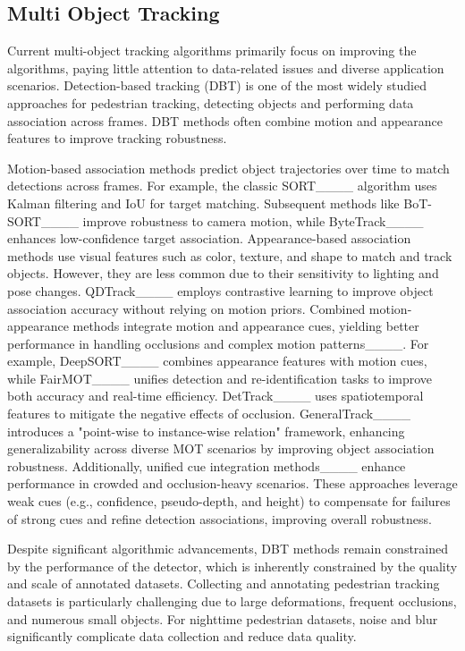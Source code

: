 \subsection{Multi Object Tracking}
Current multi-object tracking algorithms primarily focus on improving the algorithms, paying little attention to data-related issues and diverse application scenarios. Detection-based tracking (DBT) is one of the most widely studied approaches for pedestrian tracking, detecting objects and performing data association across frames. DBT methods often combine motion and appearance features to improve tracking robustness.

Motion-based association methods predict object trajectories over time to match detections across frames. For example, the classic SORT____ algorithm uses Kalman filtering and IoU for target matching. Subsequent methods like BoT-SORT____ improve robustness to camera motion, while ByteTrack____ enhances low-confidence target association.
Appearance-based association methods use visual features such as color, texture, and shape to match and track objects. However, they are less common due to their sensitivity to lighting and pose changes. QDTrack____ employs contrastive learning to improve object association accuracy without relying on motion priors.
Combined motion-appearance methods integrate motion and appearance cues, yielding better performance in handling occlusions and complex motion patterns____. For example, DeepSORT____ combines appearance features with motion cues, while FairMOT____ unifies detection and re-identification tasks to improve both accuracy and real-time efficiency. DetTrack____ uses spatiotemporal features to mitigate the negative effects of occlusion. GeneralTrack____ introduces a "point-wise to instance-wise relation" framework, enhancing generalizability across diverse MOT scenarios by improving object association robustness.
Additionally, unified cue integration methods____ enhance performance in crowded and occlusion-heavy scenarios. These approaches leverage weak cues (e.g., confidence, pseudo-depth, and height) to compensate for failures of strong cues and refine detection associations, improving overall robustness.

Despite significant algorithmic advancements, DBT methods remain constrained by the performance of the detector, which is inherently constrained by the quality and scale of annotated datasets. Collecting and annotating pedestrian tracking datasets is particularly challenging due to large deformations, frequent occlusions, and numerous small objects. For nighttime pedestrian datasets, noise and blur significantly complicate data collection and reduce data quality.

